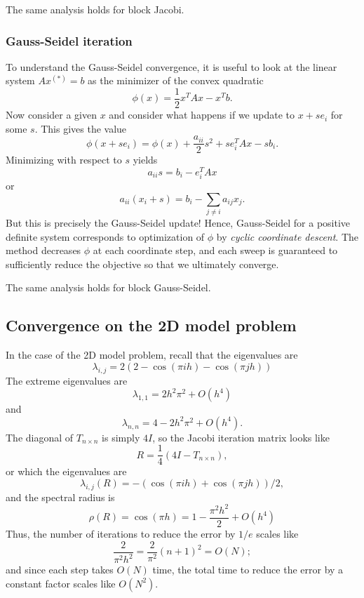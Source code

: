 \documentclass[12pt, leqno]{article} %
\begin{document}
The same analysis holds for block Jacobi.

\subsubsection{Gauss-Seidel iteration}

To understand the Gauss-Seidel convergence, it is useful to look at
the linear system $Ax^{(*)} = b$ as the minimizer of the convex quadratic
\[
  \phi(x) = \frac{1}{2} x^T A x - x^T b.
\]
Now consider a given $x$ and consider what happens if we update to
$x + s e_i$ for some $s$.  This gives the value
\[
  \phi(x+s e_i) = \phi(x) + \frac{a_{ii}}{2} s^2 + s e_i^T A x - s b_i.
\]
Minimizing with respect to $s$ yields
\[
  a_{ii} s = b_i - e_i^T A x
\]
or
\[
  a_{ii} (x_i + s) = b_i - \sum_{j \neq i} a_{ij} x_j.
\]
But this is precisely the Gauss-Seidel update!  Hence, Gauss-Seidel for
a positive definite system corresponds to optimization of $\phi$ by
{\em cyclic coordinate descent}.  The method decreases $\phi$ at each
coordinate step, and each sweep is guaranteed to sufficiently reduce
the objective so that we ultimately converge.

The same analysis holds for block Gauss-Seidel.

\subsection{Convergence on the 2D model problem}

In the case of the 2D model problem, recall that the eigenvalues are
\[
  \lambda_{i,j} =
  2\left(
    2-\cos(\pi i h)-\cos (\pi j h)
  \right)
\]
The extreme eigenvalues are
\[
  \lambda_{1,1} = 2 h^2 \pi^2 + O(h^4)
\]
and
\[
  \lambda_{n,n} = 4-2 h^2 \pi^2 + O(h^4).
\]
The diagonal of $T_{n\times n}$ is simply $4I$, so the Jacobi
iteration matrix looks like
\[
  R = \frac{1}{4} (4I-T_{n\times n}),
\]
or which the eigenvalues are
\[
  \lambda_{i,j}(R) = -(\cos(\pi i h)+\cos(\pi j h))/2,
\]
and the spectral radius is
\[
  \rho(R) = \cos(\pi h) = 1-\frac{\pi^2 h^2}{2} + O(h^4)
\]
Thus, the number of iterations to reduce the error by $1/e$ scales like
\[
  \frac{2}{\pi^2 h^2} = \frac{2}{\pi^2} (n+1)^2 = O(N);
\]
and since each step takes $O(N)$ time, the total time to reduce the
error by a constant factor scales like $O(N^2)$.
\end{document}
